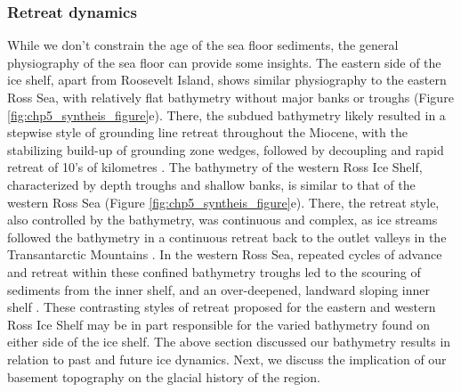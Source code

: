 \subsubsection{Retreat dynamics}
While we don't constrain the age of the sea floor sediments, the general physiography of the sea floor can provide some insights. The eastern side of the ice shelf, apart from Roosevelt Island, shows similar physiography to the eastern Ross Sea, with relatively flat bathymetry without major banks or troughs (Figure \ref{fig:chp5_syntheis_figure}e). There, the subdued bathymetry likely resulted in a stepwise style of grounding line retreat throughout the Miocene, with the stabilizing build-up of grounding zone wedges, followed by decoupling and rapid retreat of 10's of kilometres \citep{bartparadox2017, andersonseismic2019}. The bathymetry of the western Ross Ice Shelf, characterized by depth troughs and shallow banks, is similar to that of the western Ross Sea (Figure \ref{fig:chp5_syntheis_figure}e). There, the retreat style, also controlled by the bathymetry, was continuous and complex, as ice streams followed the bathymetry in a continuous retreat back to the outlet valleys in the Transantarctic Mountains \citep{halberstadticesheet2016, andersonseismic2019}. 
In the western Ross Sea, repeated cycles of advance and retreat within these confined bathymetry troughs led to the scouring of sediments from the inner shelf, and an over-deepened, landward sloping inner shelf \citep{andersonseismic2019}. These contrasting styles of retreat proposed for the eastern and western Ross Ice Shelf may be in part responsible for the varied bathymetry found on either side of the ice shelf. The above section discussed our bathymetry results in relation to past and future ice dynamics. Next, we discuss the implication of our basement topography on the glacial history of the region. \\

